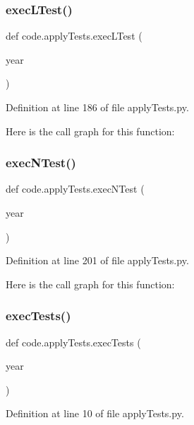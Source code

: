 \subsubsection{\texorpdfstring{exec\+L\+Test()}{execLTest()}}
{\footnotesize\ttfamily def code.\+apply\+Tests.\+exec\+L\+Test (\begin{DoxyParamCaption}\item[{}]{year }\end{DoxyParamCaption})}



Definition at line 186 of file apply\+Tests.\+py.

Here is the call graph for this function\+:
\mbox{\label{namespacecode_1_1apply_tests_a078400e5967e6416e481040be98662ef}} 
\subsubsection{\texorpdfstring{exec\+N\+Test()}{execNTest()}}
{\footnotesize\ttfamily def code.\+apply\+Tests.\+exec\+N\+Test (\begin{DoxyParamCaption}\item[{}]{year }\end{DoxyParamCaption})}



Definition at line 201 of file apply\+Tests.\+py.

Here is the call graph for this function\+:
\mbox{\label{namespacecode_1_1apply_tests_a91f5be82efab33aaac0749d996b01619}} 
\subsubsection{\texorpdfstring{exec\+Tests()}{execTests()}}
{\footnotesize\ttfamily def code.\+apply\+Tests.\+exec\+Tests (\begin{DoxyParamCaption}\item[{}]{year }\end{DoxyParamCaption})}



Definition at line 10 of file apply\+Tests.\+py.

